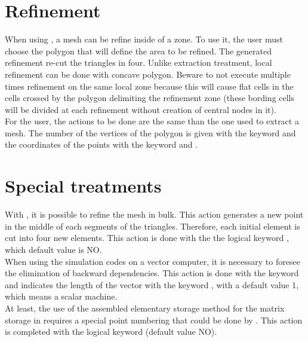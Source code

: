 \section{Refinement}
When using \stbtel, a mesh can be refine inside of a zone. To use it, the user
must choose the polygon that will define the area to be refined. The generated
refinement re-cut the triangles in four. Unlike extraction treatment, local
refinement can be done with concave polygon. Beware to not execute multiple
times refinement on the same local zone because this will cause flat cells in
the cells crossed by the polygon delimiting the refinement zone (these bording
cells will be divided at each refinement without creation of central nodes in
it).\\
For the user, the actions to be done are the same than the one used to extract
a mesh.  The number of the vertices of the polygon is given with the keyword
 and the
coordinates of the points with the keyword  and .
\section{Special treatments}
With \stbtel, it is possible to refine the mesh in bulk. This action generates
a new point in the middle of each segments of the triangles. Therefore, each
initial element is cut into four new elements. This action is done with the the
logical keyword , which default value is NO.\\
When using the simulation codes on a vector computer, it is necessary to
foresee the elimination of backward dependencies. This action is done with the
keyword  and indicates the
length of the vector with the keyword , with a default
value 1, which means a scalar machine.\\
At least, the use of the assembled elementary storage method for the matrix
storage in  requires a special point numbering that could be done by
\stbtel. This action is completed with the logical keyword  (default value NO).
